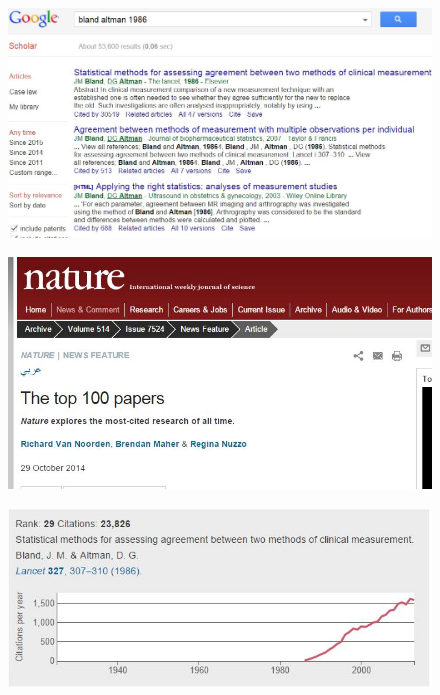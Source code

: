 \documentclass[compress]{beamer}        %
\begin{document}
\begin{frame}
	\begin{figure}
\centering
\includegraphics[width=0.9\linewidth]{BACITE}

\label{fig:BACITE}
\end{figure}

\end{frame}
\begin{frame}
	\begin{figure}
		\centering
		\includegraphics[width=0.9\linewidth]{BACITENATURE}
		
		\label{fig:BACITENATURE}
	\end{figure}
	
\end{frame}
\begin{frame}
	\begin{figure}
		\centering
		\includegraphics[width=0.99\linewidth]{BACITE1}
		
		\label{fig:BACITE1}
	\end{figure}
	
\end{frame}
\end{document}
